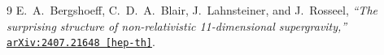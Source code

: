 \documentclass[11pt,a4paper]{article}
\begin{document}
\begin{thebibliography}{9}
E.~A.~Bergshoeff, C.~D.~A.~Blair, J.~Lahnsteiner, and J.~Rosseel,
\emph{``The surprising structure of non-relativistic 11-dimensional supergravity,''}
\href{https://arxiv.org/abs/2407.21648}{\texttt{arXiv:2407.21648 [hep-th]}}.
\end{thebibliography}
\end{document}
